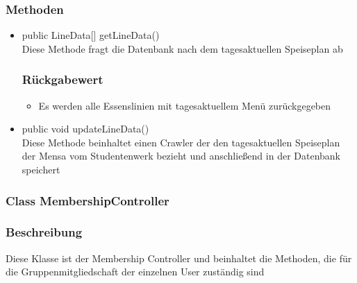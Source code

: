 \documentclass[a4paper]{scrreprt}
\begin{document}
\subsubsection*{Methoden}
\begin{addmargin}[25pt]{0pt}
\begin{itemize}

\item public LineData[] getLineData()\\
	Diese Methode fragt die Datenbank nach dem tagesaktuellen Speiseplan ab

	\subsubsection*{Rückgabewert}
	\begin{itemize}
	\item Es werden alle Essenslinien mit tagesaktuellem Menü zurückgegeben
	\end{itemize}
	
\item public void updateLineData()\\
	Diese Methode beinhaltet einen Crawler der den tagesaktuellen Speiseplan der Mensa vom Studentenwerk bezieht und anschließend in der Datenbank speichert
\end{itemize}
\end{addmargin}

\subsubsection{Class MembershipController}
\subsubsection*{Beschreibung}
Diese Klasse ist der Membership Controller und beinhaltet die Methoden, die für die Gruppenmitgliedschaft der einzelnen User zuständig sind
\end{document}
